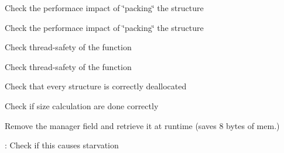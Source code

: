 
\begin{DoxyRefList}
\item[Global \mbox{\hyperlink{types_8h_a0c005c0a22e0c7fd81ee588076782ee5}{\+\_\+\+\_\+attribute\+\_\+\+\_\+}} ((packed)) g\+\_\+flags\+\_\+t]\label{todo__todo000009}%
%
Check the performace impact of \char`\"{}packing\char`\"{} the structure 
\item[Global \mbox{\hyperlink{types_8h_a0c005c0a22e0c7fd81ee588076782ee5}{\+\_\+\+\_\+attribute\+\_\+\+\_\+}} ((packed)) g\+\_\+flags\+\_\+t]\label{todo__todo000009}%
%
Check the performace impact of \char`\"{}packing\char`\"{} the structure 
\item[Global \mbox{\hyperlink{message_8h_ad117d4757e857e3f53219e970bd4e9ba}{copy\+\_\+msg\+\_\+from\+\_\+user}} (msg\+\_\+t $\ast$kmsg, const char $\ast$umsg, const ssize\+\_\+t \+\_\+size)]\label{todo__todo000006}%
%
Check thread-\/safety of the function  
\item[Global \mbox{\hyperlink{message_8h_a70ecba8a2f8f11a1e058030e522e9d3a}{copy\+\_\+msg\+\_\+to\+\_\+user}} (const msg\+\_\+t $\ast$kmsg, \+\_\+\+\_\+user char $\ast$ubuffer, const ssize\+\_\+t \+\_\+size)]\label{todo__todo000005}%
%
Check thread-\/safety of the function  
\item[Global \mbox{\hyperlink{main__device_8h_a48d8e84c8660710553f0beddd8b95b6a}{main\+Exit}} (void)]\label{todo__todo000003}%
%
Check that every structure is correctly deallocated  
\item[Global \mbox{\hyperlink{message_8h_aba1d8514abde9dfb52f2fb006fd5dbf1}{queue\+Garbage\+Collector}} (struct work\+\_\+struct $\ast$work)]\label{todo__todo000007}%
%
Check if size calculation are done correctly 
\item[Class \mbox{\hyperlink{structt__message__delayed__deliver}{t\+\_\+message\+\_\+delayed\+\_\+deliver}} ]\label{todo__todo000008}%
%
Remove the \textquotesingle{}manager\textquotesingle{} field and retrieve it at runtime (saves 8 bytes of mem.)  
\item[Global \mbox{\hyperlink{group__manager_8h_a7a4a1f2ed5563df3defd7477a8f70168}{unregister\+Group\+Device}} (\mbox{\hyperlink{structgroup__data}{group\+\_\+data}} $\ast$grp\+\_\+data, bool flag)]\label{todo__todo000001}%
%
\+: Check if this causes starvation 
\end{DoxyRefList}